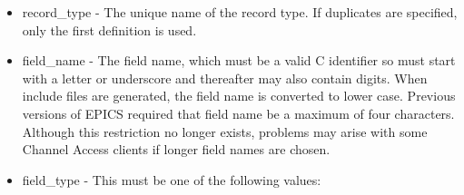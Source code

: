\begin{itemize}\item {}record\_type - The unique name of the record type. If duplicates are specified, only the first definition is used.

\item {}field\_name - The field name, which must be a valid C identifier so must start with a letter or underscore and 
thereafter may also contain digits. When include files are generated, the field name is converted to lower case. 
Previous versions of EPICS required that field name be a maximum of four characters. Although this restriction  no 
longer exists, problems may arise with some Channel Access clients if longer field names are chosen.

\item {}field\_type - This must be one of the following values:


\end{itemize}
